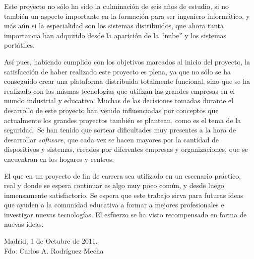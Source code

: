 Este proyecto no sólo ha sido la culminación de seis años de 
estudio, si no también un aspecto importante en la formación para ser 
ingeniero informático, y más aún si la especialidad son los sistemas 
distribuidos, que ahora tanta importancia han adquirido desde la 
aparición de la ``nube'' y los sistemas portátiles.

Así pues, habiendo cumplido con los objetivos marcados al inicio del 
proyecto, la satisfacción de haber realizado este proyecto es plena, 
ya que no sólo se ha conseguido crear una plataforma distribuida 
totalmente funcional, sino que se ha realizado con las mismas 
tecnologías que utilizan las grandes empresas en el mundo industrial y 
educativo. Muchas de las decisiones tomadas durante el desarrollo de 
este proyecto han venido influenciadas por conceptos que actualmente 
los grandes proyectos también se plantean, como es el tema de la 
seguridad. Se han tenido que sortear dificultades muy presentes a la 
hora de desarrollar \emph{software}, que cada vez se hacen mayores 
por la cantidad de dispositivos y sistemas, creados por diferentes 
empresas y organizaciones, que se encuentran en los hogares y centros.

El que en un proyecto de fin de carrera sea utilizado en un escenario 
práctico, real y donde se espera continuar es algo muy poco común, y 
desde luego inmensamente satisfactorio. Se espera que este trabajo 
sirva para futuras ideas que ayuden a la comunidad educativa a formar 
a mejores profesionales e investigar nuevas tecnologías. El esfuerzo 
se ha visto recompensado en forma de nuevas ideas.

\vspace{1cm}

\begin{flushright}
Madrid, 1 de Octubre de 2011.\\
\vspace{2.5cm}
Fdo: Carlos A. Rodríguez Mecha
\end{flushright}

\cleardoublepage
